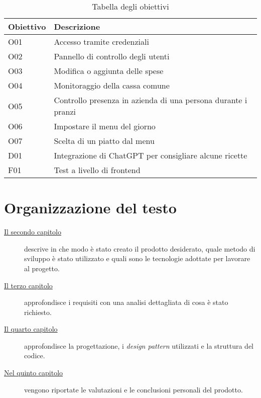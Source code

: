 \begin{table}[htb]%
    \caption{Tabella degli obiettivi}
    \label{tab:obiettivi-richiesti}
    \begin{tabularx}{\textwidth}{lX}
    \hline
    \textbf{Obiettivo} & \textbf{Descrizione} \\
    \hline\hline
    O01     & Accesso tramite credenziali \\
    \hline
    O02     & Pannello di controllo degli utenti \\
    \hline
    O03     & Modifica o aggiunta delle spese \\
    \hline
    O04     & Monitoraggio della cassa comune \\
    \hline
    O05     & Controllo presenza in azienda di una persona durante i pranzi \\
    \hline
    O06     & Impostare il menu del giorno \\
    \hline
    O07     & Scelta di un piatto dal menu \\
    \hline
    D01     & Integrazione di ChatGPT per consigliare alcune ricette \\
    \hline
    F01     & Test a livello di frontend \\
    \hline
    \end{tabularx}
\end{table}%

\newpage

\section{Organizzazione del testo}

\begin{description}
    \item[{\hyperref[cap:processi-metodologie]{Il secondo capitolo}}] descrive in che modo è stato creato il prodotto desiderato, quale metodo di sviluppo è stato utilizzato e quali sono le tecnologie adottate per lavorare al progetto.
    
    
    \item[{\hyperref[cap:analisi-requisiti]{Il terzo capitolo}}] approfondisce i requisiti con una analisi dettagliata di cosa è stato richiesto.
    
    \item[{\hyperref[cap:progettazione-codifica]{Il quarto capitolo}}] approfondisce la progettazione, i \emph{design pattern} utilizzati e la struttura del codice.
    
    
    \item[{\hyperref[cap:conclusioni]{Nel quinto capitolo}}] vengono riportate le valutazioni e le conclusioni personali del prodotto.
\end{description}


